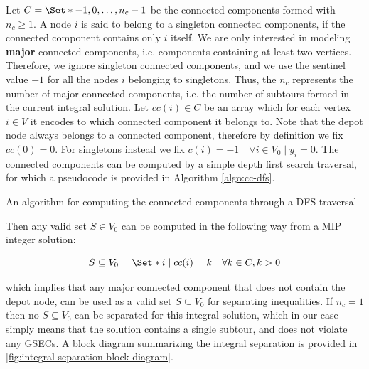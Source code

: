 Let $C = \Set*{-1, 0, \dots, n_c - 1}$ be the connected components formed with $n_c \ge 1$.
A node $i$ is said to belong to a singleton connected components, if the connected component contains only $i$ itself.
We are only interested in modeling \textbf{major} connected components, i.e. components containing at least two vertices.
Therefore, we ignore singleton connected components, and we use the sentinel value $-1$ for all the nodes $i$ belonging to singletons.
Thus, the $n_c$ represents the number of major connected components, i.e. the number of subtours formed in the current integral solution.
Let $cc(i) \in C$ be an array which for each vertex $i \in V$ it encodes to which connected component it belongs to.
Note that the depot node always belongs to a connected component, therefore by definition we fix $cc(0) = 0$.
For singletons instead we fix $c(i) = -1  \quad \forall i \in V_0 \mid y_i = 0$.
The connected components can be computed by a simple depth first search traversal, for which a pseudocode is provided in Algorithm \ref{algo:cc-dfs}.

\begin{algorithm}
	\caption{An algorithm for computing the connected components through a DFS traversal}
	
	\label{algo:cc-dfs}
\end{algorithm}

Then any valid set $S \in V_0$ can be computed in the following way from a MIP integer solution:

\begin{equation}
	S \subseteq V_0 = \Set* {i \mid cc(i) = k}   \quad \forall k \in C, k > 0
\end{equation}

which implies that any major connected component that does not contain the depot node, can be used as a valid set $S \subseteq V_0$ for separating inequalities.
If $n_c = 1$ then no $S \subseteq V_0$ can be separated for this integral solution, which in our case simply means that the solution contains a single subtour, and does not violate any GSECs.
A block diagram summarizing the integral separation is provided in \cref{fig:integral-separation-block-diagram}.

